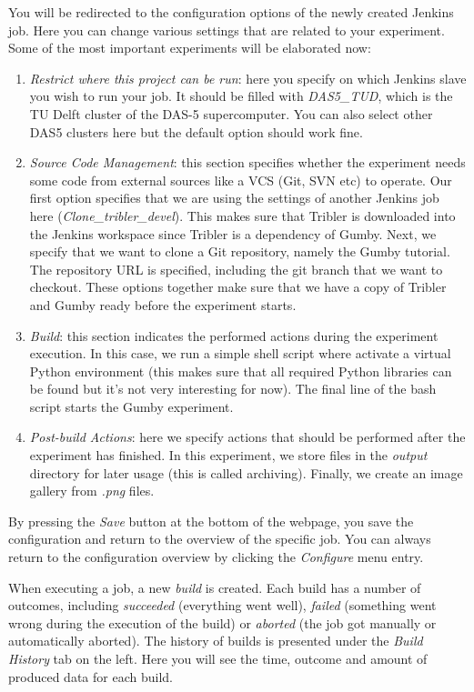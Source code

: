 \documentclass{article}
\begin{document}
You will be redirected to the configuration options of the newly created Jenkins job.
Here you can change various settings that are related to your experiment.
Some of the most important experiments will be elaborated now:

\begin{enumerate}
	\item \emph{Restrict where this project can be run}: here you specify on which Jenkins slave you wish to run your job. It should be filled with \emph{DAS5\_TUD}, which is the TU Delft cluster of the DAS-5 supercomputer. You can also select other DAS5 clusters here but the default option should work fine.
	\item \emph{Source Code Management}: this section specifies whether the experiment needs some code from external sources like a VCS (Git, SVN etc) to operate. Our first option specifies that we are using the settings of another Jenkins job here (\emph{Clone\_tribler\_devel}). This makes sure that Tribler is downloaded into the Jenkins workspace since Tribler is a dependency of Gumby. Next, we specify that we want to clone a Git repository, namely the Gumby tutorial. The repository URL is specified, including the git branch that we want to checkout. These options together make sure that we have a copy of Tribler and Gumby ready before the experiment starts.
	\item \emph{Build}: this section indicates the performed actions during the experiment execution. In this case, we run a simple shell script where activate a virtual Python environment (this makes sure that all required Python libraries can be found but it's not very interesting for now). The final line of the bash script starts the Gumby experiment.
	\item \emph{Post-build Actions}: here we specify actions that should be performed after the experiment has finished. In this experiment, we store files in the \emph{output} directory for later usage (this is called archiving). Finally, we create an image gallery from \emph{.png} files.
\end{enumerate}

By pressing the \emph{Save} button at the bottom of the webpage, you save the configuration and return to the overview of the specific job.
You can always return to the configuration overview by clicking the \emph{Configure} menu entry.

When executing a job, a new \emph{build} is created.
Each build has a number of outcomes, including \emph{succeeded} (everything went well), \emph{failed} (something went wrong during the execution of the build) or \emph{aborted} (the job got manually or automatically aborted).
The history of builds is presented under the \emph{Build History} tab on the left.
Here you will see the time, outcome and amount of produced data for each build.
\end{document}
